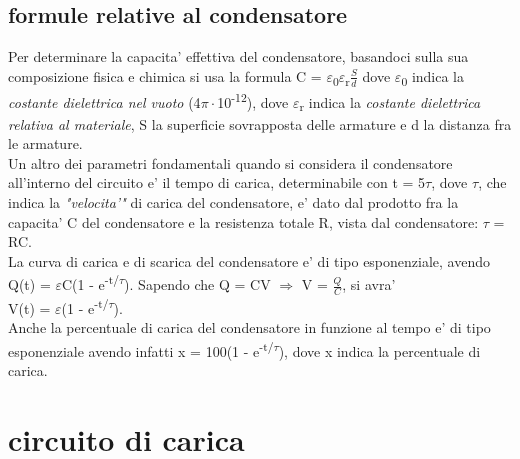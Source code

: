 \documentclass[12pt]{article}
\begin{document}
\subsection*{formule relative al condensatore}
Per determinare la capacita' effettiva del condensatore, basandoci sulla sua composizione fisica e chimica si usa la formula 
C = $\varepsilon$\textsubscript{0}$\varepsilon$\textsubscript{r}$\frac{S}{d}$
dove $\varepsilon$\textsubscript{0} indica la 
\textit{costante dielettrica nel vuoto} (4$\pi\cdot$10\textsuperscript{-12}),
dove $\varepsilon$\textsubscript{r} indica la \textit{costante dielettrica relativa al materiale},
S la superficie sovrapposta delle armature e d la distanza fra le armature. \\

Un altro dei parametri fondamentali quando si considera il condensatore all'interno
del circuito e' il tempo di carica, determinabile con t = 5$\tau$, dove $\tau$, 
che indica la \textit{"velocita'"} di carica del condensatore, e' dato dal prodotto fra 
la capacita' C del condensatore e la resistenza totale R, vista dal condensatore: $\tau$ = RC. \\

La curva di carica e di scarica del condensatore e' di tipo esponenziale, avendo
Q(t) = $\varepsilon$C(1 - e\textsuperscript{-t/$\tau$}).
Sapendo che Q = CV $\Rightarrow$ V = $\frac{Q}{C}$, si avra' \\
V(t) = $\varepsilon$(1 - e\textsuperscript{-t/$\tau$}). \\

Anche la percentuale di carica del condensatore in funzione al tempo e' di tipo esponenziale
avendo infatti x = 100(1 - e\textsuperscript{-t/$\tau$}), dove x indica la percentuale di carica.

\newpage

\section*{circuito di carica}
\end{document}
